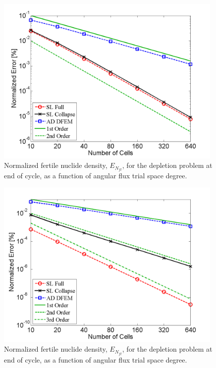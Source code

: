 \begin{figure}[!htp]
\centering
\includegraphics[width=11cm]{chapter5_depletion/ft_P1_norm_err.png}
\caption{Normalized fertile nuclide density, $E_{N_{ft}}$, for the depletion problem at end of cycle, as a function of angular flux trial space degree.}
\label{fig:depletion_NFT_p1}
\end{figure}

\begin{figure}[!hbp]
\centering
\includegraphics[width=11cm]{chapter5_depletion/ft_P2_norm_err.png}
\caption{Normalized fertile nuclide density, $E_{N_{ft}}$, for the depletion problem at end of cycle, as a function of angular flux trial space degree.}
\label{fig:depletion_NFT_p2}
\end{figure}

